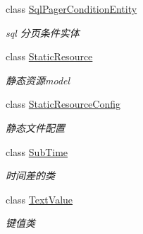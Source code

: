 \begin{DoxyCompactItemize}
class \hyperlink{class_x_c_l_net_tools_1_1_entity_1_1_sql_pager_condition_entity}{Sql\+Pager\+Condition\+Entity}
\begin{DoxyCompactList}\small\item\em sql 分页条件实体 \end{DoxyCompactList}\item 
class \hyperlink{class_x_c_l_net_tools_1_1_entity_1_1_static_resource}{Static\+Resource}
\begin{DoxyCompactList}\small\item\em 静态资源model \end{DoxyCompactList}\item 
class \hyperlink{class_x_c_l_net_tools_1_1_entity_1_1_static_resource_config}{Static\+Resource\+Config}
\begin{DoxyCompactList}\small\item\em 静态文件配置 \end{DoxyCompactList}\item 
class \hyperlink{class_x_c_l_net_tools_1_1_entity_1_1_sub_time}{Sub\+Time}
\begin{DoxyCompactList}\small\item\em 时间差的类 \end{DoxyCompactList}\item 
class \hyperlink{class_x_c_l_net_tools_1_1_entity_1_1_text_value}{Text\+Value}
\begin{DoxyCompactList}\small\item\em 键值类 \end{DoxyCompactList}\end{DoxyCompactItemize}
